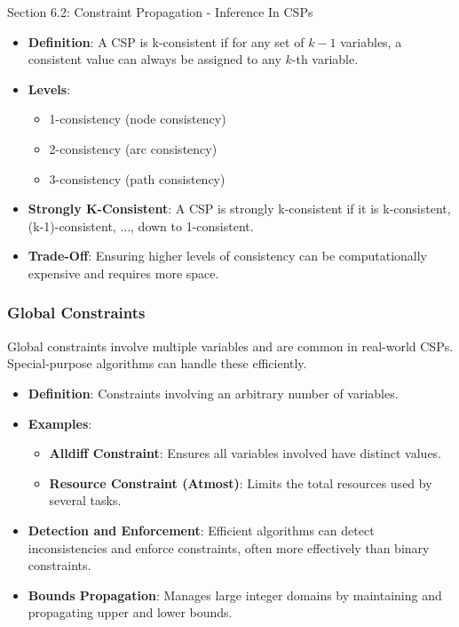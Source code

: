 \begin{notes}{Section 6.2: Constraint Propagation - Inference In CSPs}
\begin{highlight}[K-Consistency]
        \begin{itemize}
            \item \textbf{Definition}: A CSP is k-consistent if for any set of $k-1$ variables, a consistent value can always be assigned to any $k$-th variable.
            \item \textbf{Levels}: 
                \begin{itemize}
                    \item 1-consistency (node consistency)
                    \item 2-consistency (arc consistency)
                    \item 3-consistency (path consistency)
                \end{itemize}
            \item \textbf{Strongly K-Consistent}: A CSP is strongly k-consistent if it is k-consistent, (k-1)-consistent, ..., down to 1-consistent.
            \item \textbf{Trade-Off}: Ensuring higher levels of consistency can be computationally expensive and requires more space.
        \end{itemize}
    
    \end{highlight}
    
    \subsubsection*{Global Constraints}
    
    Global constraints involve multiple variables and are common in real-world CSPs. Special-purpose algorithms can handle these efficiently.
    
    \begin{highlight}
    
        \begin{itemize}
            \item \textbf{Definition}: Constraints involving an arbitrary number of variables.
            \item \textbf{Examples}:
                \begin{itemize}
                    \item \textbf{Alldiff Constraint}: Ensures all variables involved have distinct values.
                    \item \textbf{Resource Constraint (Atmost)}: Limits the total resources used by several tasks.
                \end{itemize}
            \item \textbf{Detection and Enforcement}: Efficient algorithms can detect inconsistencies and enforce constraints, often more effectively than binary constraints.
            \item \textbf{Bounds Propagation}: Manages large integer domains by maintaining and propagating upper and lower bounds.
        \end{itemize}
    

\end{highlight}
\end{notes}
